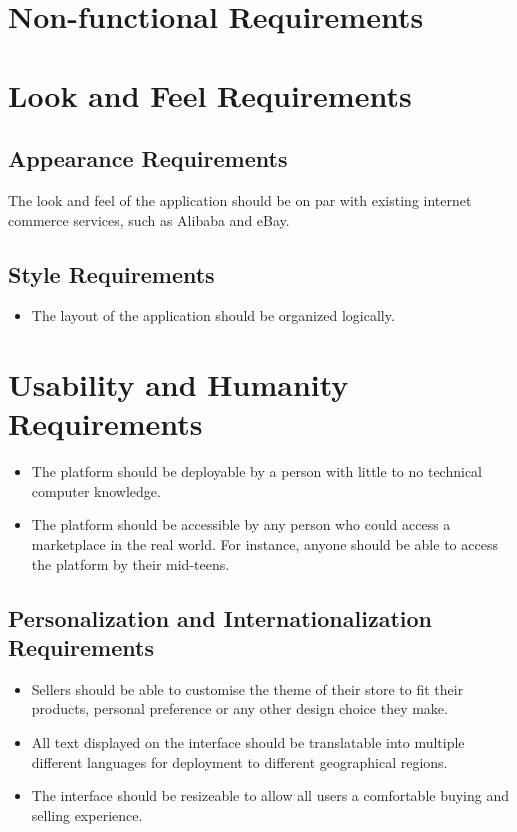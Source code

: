 \documentclass{article}
\begin{document}
\section*{Non-functional Requirements}
\section{Look and Feel Requirements}
\subsection{Appearance Requirements}
The look and feel of the application should be on par with existing internet commerce services, such as Alibaba and eBay. 
\subsection{Style Requirements}
\begin{itemize}
\item
The layout of the application should be organized logically.
\end{itemize}
\section{Usability and Humanity Requirements}
\begin{itemize}
\item
The platform should be deployable by a person with little to no technical computer knowledge.
\item
The platform should be accessible by any person who could access a marketplace in the real world. For instance, anyone should be able to access the platform by their mid-teens.
\end{itemize}
\subsection{Personalization and Internationalization Requirements}
\begin{itemize}
\item
Sellers should be able to customise the theme of their store to fit their products, personal preference or any other design choice they make. 
\item
All text displayed on the interface should be translatable into multiple different languages for deployment to different geographical regions.
\item
The interface should be resizeable to allow all users a comfortable buying and selling experience.
\end{itemize}
\end{document}
